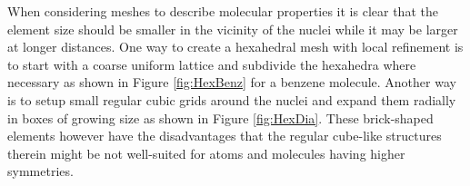 When considering meshes to describe molecular properties it is clear that the element size should be smaller in the vicinity of the nuclei while it may be larger at longer distances.
One way to create a hexahedral mesh with local refinement is to start with a coarse uniform lattice and subdivide the hexahedra where necessary as shown in Figure \ref{fig:HexBenz} for a benzene molecule.
Another way is to setup small regular cubic grids around the nuclei and expand them radially in boxes of growing size as shown in Figure \ref{fig:HexDia}.
These brick-shaped elements however have the disadvantages that the regular cube-like structures therein might be not well-suited for atoms and molecules having higher symmetries.

